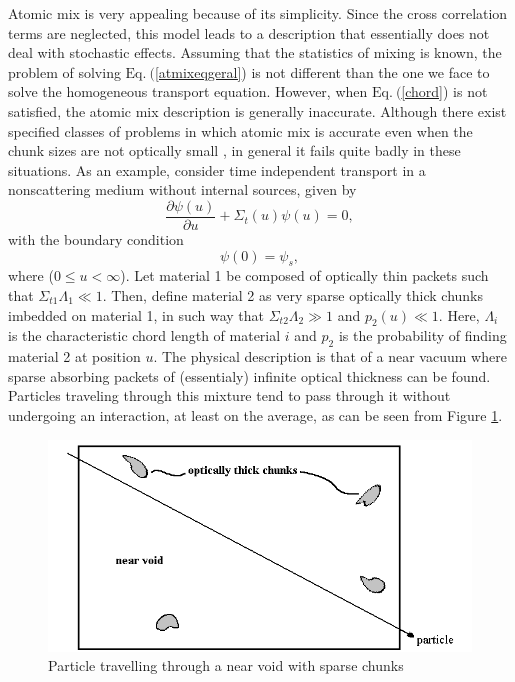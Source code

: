 \documentclass[12pt]{article}
\begin{document}
Atomic mix is very appealing because of its simplicity.
Since the cross correlation terms are neglected, this model leads to a description that essentially does not deal with stochastic effects.
Assuming that the statistics of mixing is known,  the problem of solving $\textrm{Eq.}\ ($\ref{atmixeqgeral}) is not different than the one we face to
 solve the homogeneous transport equation.
 However, when $\textrm{Eq.}\ ($\ref{chord}) is not satisfied, the atomic mix description is generally inaccurate.
Although there exist specified classes of problems in which atomic mix is accurate even when the chunk sizes are not optically small \cite{larsen_03,larsen_rio}, in general it fails quite badly in these situations.
As an example, consider time independent transport in a nonscattering medium without internal sources, given by
\begin{equation}\label{exemploatmix}
\frac{\partial\psi(u)}{\partial u}+\Sigma_t(u)\psi(u)=0,
\end{equation}
with the boundary condition
\begin{equation}\label{ccexemploatmix}
\psi(0) = \psi_{s},
\end{equation}
where ($0\leq u<\infty$).
Let material 1 be composed of optically thin packets such that $\Sigma_{t1}\Lambda_1\ll 1$.
Then, define material 2 as very sparse optically thick chunks imbedded on material 1, in such way that $\Sigma_{t2}\Lambda_2 \gg 1$ and $p_2(u) \ll 1$.
Here, $\Lambda_i$ is the characteristic chord length of material $i$ and $p_2$ is the probability of finding material 2 at position $u$.
The physical description is that of a near vacuum where sparse absorbing packets of (essentialy) infinite optical thickness can be found.
Particles traveling through this mixture tend to pass through it without undergoing an interaction, at least on the average, as can be seen from Figure \ref{fig_near_void}.
\begin{figure}[t]
\centering
\includegraphics[height=6.45 cm,width= 12.9 cm]{nearvoid}
\caption{\footnotesize{Particle travelling through a near void with sparse chunks}}\label{fig_near_void}
\end{figure}
\end{document}

